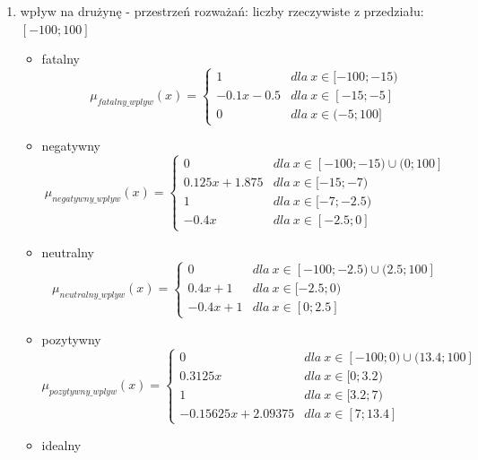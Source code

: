 \documentclass{classrep}
\begin{document}
\begin{enumerate}
    \item wpływ na drużynę - przestrzeń rozważań: liczby rzeczywiste z przedziału:  $[-100;100]$
    \begin{itemize}
        \item fatalny
        \begin{equation}
            \mu_{fatalny\_wplyw}(x) = \left\{\begin{matrix} 1 & dla \: x\in[-100;-15) \\ -0.1x - 0.5 & dla \: x\in [-15; -5] \\ 0 & dla \: x\in (-5;100] \end{matrix}\right.
        \end{equation}
         \item negatywny
        \begin{equation}
            \mu_{negatywny\_wplyw}(x) = \left\{\begin{matrix} 0 & dla \: x\in [-100;-15) \cup (0;100] \\ 0.125x + 1.875 & dla \: x\in[-15;-7) \\ 1 & dla \: x\in [-7;-2.5) \\ -0.4x & dla \: x\in [-2.5; 0]  \end{matrix}\right.
        \end{equation}
        \item neutralny
        \begin{equation}
            \mu_{neutralny\_wplyw}(x) = \left\{\begin{matrix} 0 & dla \: x\in [-100;-2.5) \cup (2.5;100]  \\ 0.4x + 1 & dla \: x\in[-2.5;0) \\ -0.4x + 1 & dla \: x\in [0; 2.5] \end{matrix}\right.
        \end{equation}
        \item pozytywny
        \begin{equation}
            \mu_{pozytywny\_wplyw}(x) = \left\{\begin{matrix} 0 & dla \: x\in [-100;0) \cup (13.4;100] \\ 0.3125x & dla \: x\in[0;3.2) \\ 1 & dla \: x\in [3.2;7) \\ -0.15625x + 2.09375 & dla \: x\in [7; 13.4]\end{matrix}\right.
        \end{equation}
        \item idealny
        \begin{equation}

\end{equation}
\end{itemize}
\end{enumerate}
\end{document}

